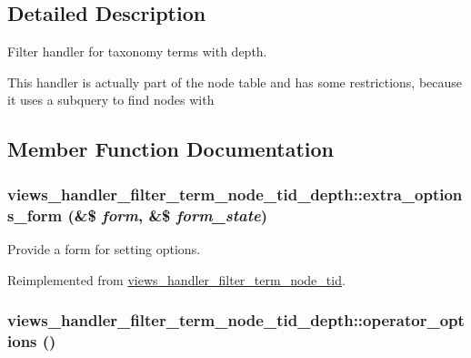 \subsection{Detailed Description}
Filter handler for taxonomy terms with depth.

This handler is actually part of the node table and has some restrictions, because it uses a subquery to find nodes with 

\subsection{Member Function Documentation}
\hypertarget{classviews__handler__filter__term__node__tid__depth_704c5e42a5a41ee12bd01b1b153431e4}{
\subsubsection[{extra\_\-options\_\-form}]{\setlength{\rightskip}{0pt plus 5cm}views\_\-handler\_\-filter\_\-term\_\-node\_\-tid\_\-depth::extra\_\-options\_\-form (\&\$ {\em form}, \/  \&\$ {\em form\_\-state})}}
\label{classviews__handler__filter__term__node__tid__depth_704c5e42a5a41ee12bd01b1b153431e4}


Provide a form for setting options. 

Reimplemented from \hyperlink{classviews__handler__filter__term__node__tid_df599d1bef08003b1b734dfd397030a6}{views\_\-handler\_\-filter\_\-term\_\-node\_\-tid}.\hypertarget{classviews__handler__filter__term__node__tid__depth_fb7fceb94e0b622039906c0d97d64f4d}{
\subsubsection[{operator\_\-options}]{\setlength{\rightskip}{0pt plus 5cm}views\_\-handler\_\-filter\_\-term\_\-node\_\-tid\_\-depth::operator\_\-options ()}}
\label{classviews__handler__filter__term__node__tid__depth_fb7fceb94e0b622039906c0d97d64f4d}


